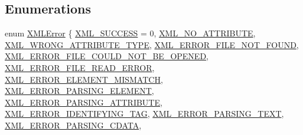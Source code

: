 \subsection*{Enumerations}
\begin{DoxyCompactItemize}
\item 
enum \hyperlink{namespacetinyxml2_a1fbf88509c3ac88c09117b1947414e08}{X\+M\+L\+Error} \{ \newline
\hyperlink{namespacetinyxml2_a1fbf88509c3ac88c09117b1947414e08a1fe1262fdb5ac05dd9cc4631f8c8e00d}{X\+M\+L\+\_\+\+S\+U\+C\+C\+E\+SS} = 0, 
\hyperlink{namespacetinyxml2_a1fbf88509c3ac88c09117b1947414e08abefb89c44285fb68e2218b2c71767f27}{X\+M\+L\+\_\+\+N\+O\+\_\+\+A\+T\+T\+R\+I\+B\+U\+TE}, 
\hyperlink{namespacetinyxml2_a1fbf88509c3ac88c09117b1947414e08ae9d8ee545a3a69e90df303257a658113}{X\+M\+L\+\_\+\+W\+R\+O\+N\+G\+\_\+\+A\+T\+T\+R\+I\+B\+U\+T\+E\+\_\+\+T\+Y\+PE}, 
\hyperlink{namespacetinyxml2_a1fbf88509c3ac88c09117b1947414e08a38fd2a97fb1dbebd4c3640d75dc01a94}{X\+M\+L\+\_\+\+E\+R\+R\+O\+R\+\_\+\+F\+I\+L\+E\+\_\+\+N\+O\+T\+\_\+\+F\+O\+U\+ND}, 
\newline
\hyperlink{namespacetinyxml2_a1fbf88509c3ac88c09117b1947414e08afbbf37655523b79a88b04b77ec0f1258}{X\+M\+L\+\_\+\+E\+R\+R\+O\+R\+\_\+\+F\+I\+L\+E\+\_\+\+C\+O\+U\+L\+D\+\_\+\+N\+O\+T\+\_\+\+B\+E\+\_\+\+O\+P\+E\+N\+ED}, 
\hyperlink{namespacetinyxml2_a1fbf88509c3ac88c09117b1947414e08a8d4dd3ce2dee784a53f62fa8a6ac83ee}{X\+M\+L\+\_\+\+E\+R\+R\+O\+R\+\_\+\+F\+I\+L\+E\+\_\+\+R\+E\+A\+D\+\_\+\+E\+R\+R\+OR}, 
\hyperlink{namespacetinyxml2_a1fbf88509c3ac88c09117b1947414e08a37759723c0c5e954597654e4eccb4f4d}{X\+M\+L\+\_\+\+E\+R\+R\+O\+R\+\_\+\+E\+L\+E\+M\+E\+N\+T\+\_\+\+M\+I\+S\+M\+A\+T\+CH}, 
\hyperlink{namespacetinyxml2_a1fbf88509c3ac88c09117b1947414e08afa96ea783aa93ea212f9e2d7d3a70ba5}{X\+M\+L\+\_\+\+E\+R\+R\+O\+R\+\_\+\+P\+A\+R\+S\+I\+N\+G\+\_\+\+E\+L\+E\+M\+E\+NT}, 
\newline
\hyperlink{namespacetinyxml2_a1fbf88509c3ac88c09117b1947414e08a380fd8846799b88773321efae83d26a3}{X\+M\+L\+\_\+\+E\+R\+R\+O\+R\+\_\+\+P\+A\+R\+S\+I\+N\+G\+\_\+\+A\+T\+T\+R\+I\+B\+U\+TE}, 
\hyperlink{namespacetinyxml2_a1fbf88509c3ac88c09117b1947414e08a48e646cfca6de90c3770faf535d3ed6b}{X\+M\+L\+\_\+\+E\+R\+R\+O\+R\+\_\+\+I\+D\+E\+N\+T\+I\+F\+Y\+I\+N\+G\+\_\+\+T\+AG}, 
\hyperlink{namespacetinyxml2_a1fbf88509c3ac88c09117b1947414e08a50ead30b94c7ae2957b9ccb08ec0994d}{X\+M\+L\+\_\+\+E\+R\+R\+O\+R\+\_\+\+P\+A\+R\+S\+I\+N\+G\+\_\+\+T\+E\+XT}, 
\hyperlink{namespacetinyxml2_a1fbf88509c3ac88c09117b1947414e08a9d181628a1819f2b97835e6bc2c8bb3b}{X\+M\+L\+\_\+\+E\+R\+R\+O\+R\+\_\+\+P\+A\+R\+S\+I\+N\+G\+\_\+\+C\+D\+A\+TA}, 

\end{DoxyCompactItemize}
